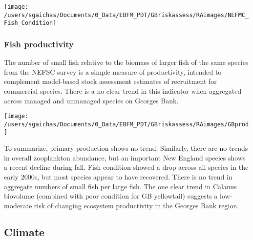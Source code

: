 \documentclass[11pt,]{article}
\let\origfigure\figure
\let\endorigfigure\endfigure
\renewenvironment{figure}[1][2] {
    \expandafter\origfigure\expandafter[H]
} {
    \endorigfigure
}
\begin{document}
\begin{figure}

{\centering \texttt{[image: /users/sgaichas/Documents/0\_Data/EBFM\_PDT/GBriskassess/RAimages/NEFMC\_Fish\_Condition]} 

}

\caption{Fish Condition (weight/length) \label{cond}}\label{fig:unnamed-chunk-6}
\end{figure}

\subsubsection{Fish productivity}\label{fish-productivity}

The number of small fish relative to the biomass of larger fish of the
same species from the NEFSC survey is a simple measure of productivity,
intended to complement model-based stock assessment estimates of
recruitment for commercial species. There is a no clear trend in this
indicator when aggregated across managed and unmanaged species on
Georges Bank.

\begin{figure}

{\centering \texttt{[image: /users/sgaichas/Documents/0\_Data/EBFM\_PDT/GBriskassess/RAimages/GBprod]} 

}

\caption{Fish productivity: Anomalies of recruit abundance per spawner biomass for species in the MAB. Annual anomalies shown are the average of spring and fall anomalies. \label{fishprodsurvey}}\label{fig:unnamed-chunk-7}
\end{figure}

To summarize, primary production shows no trend. Similarly, there are no
trends in overall zooplankton abundance, but an important New England
species shows a recent decline during fall. Fish condition showed a drop
across all species in the early 2000s, but most species appear to have
recovered. There is no trend in aggregate numbers of small fish per
large fish. The one clear trend in Calanus biovolume (combined with poor
condition for GB yellowtail) suggests a low-moderate risk of changing
ecosystem productivity in the Georges Bank region.

\subsection{Climate}\label{climate}
\end{document}

